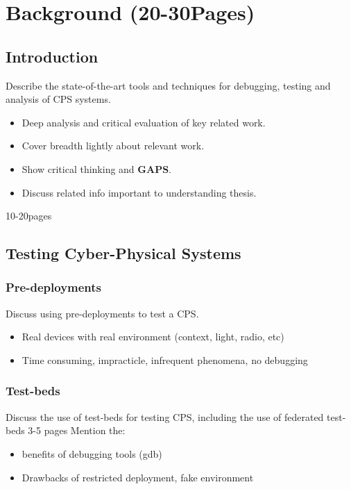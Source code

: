 
\chapter{Background (20-30Pages)}
\section{Introduction}
\label{sec:Introduction}
Describe the state-of-the-art tools and techniques for debugging, testing and analysis of CPS systems.
\begin{itemize}
  \item Deep analysis and critical evaluation of key related work.
  \item Cover breadth lightly about relevant work.
  \item Show critical thinking and \textbf{GAPS}.
  \item Discuss related info important to understanding thesis.
\end{itemize}
10-20pages

\section{Testing Cyber-Physical Systems}
\label{sec:Testing Cyber-Physical Systems}

\subsection{Pre-deployments}
\label{sub:Pre-deployments}
Discuss using pre-deployments to test a CPS.
\begin{itemize}
  \item Real devices with real environment (context, light, radio, etc)
  \item Time consuming, impracticle, infrequent phenomena, no debugging
\end{itemize}

\subsection{Test-beds}
Discuss the use of test-beds for testing CPS, including the use of federated test-beds
3-5 pages
Mention the:
\begin{itemize}
  \item benefits of debugging tools (gdb)
  \item Drawbacks of restricted deployment, fake environment
\end{itemize}

